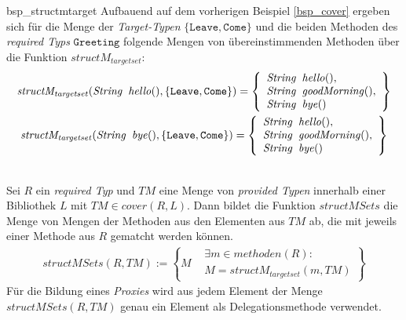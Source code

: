 \begin{example}{bsp_structmtarget}
Aufbauend auf dem vorherigen Beispiel \ref{bsp_cover} ergeben sich für die Menge der \emph{Target-Typen}  $\{\texttt{Leave}, \texttt{Come}\}$ und die beiden Methoden des \emph{required Typs} $\texttt{Greeting}$ folgende Mengen von übereinstimmenden Methoden über die Funktion $\mathit{structM_{targetset}}$:
\begin{gather*}
\mathit{structM_{targetset}(\mathit{String}\texttt{ }\mathit{hello()},\{\texttt{Leave}, \texttt{Come}\})} = 
\left\{
\begin{array}{l}
\mathit{String}\texttt{ }\mathit{hello()},\\
\mathit{String}\texttt{ }\mathit{goodMorning()},\\
\mathit{String}\texttt{ }\mathit{bye()}
\end{array}
\right\}\\
\mathit{structM_{targetset}(\mathit{String}\texttt{ }\mathit{bye()},\{\texttt{Leave}, \texttt{Come}\})} = 
\left\{
\begin{array}{l}
\mathit{String}\texttt{ }\mathit{hello()},\\
\mathit{String}\texttt{ }\mathit{goodMorning()},\\
\mathit{String}\texttt{ }\mathit{bye()}
\end{array}
\right\}
\end{gather*}
\end{example}
\noindent
\\
Sei $R$ ein \emph{required Typ} und $\mathit{TM}$ eine Menge von \emph{provided Typen} innerhalb einer Bibliothek $L$ mit $\mathit{TM} \in \mathit{cover(R,L)}$. Dann bildet die Funktion $\mathit{structMSets}$ die Menge von Mengen der Methoden aus den Elementen aus $\mathit{TM}$ ab, die mit jeweils einer Methode aus $R$ gematcht werden können.
\begin{gather*}
\mathit{structMSets(R,\mathit{TM})} := 
\left\{M
\begin{array}{l|l}
&\exists \mathit{m} \in \mathit{methoden(R)} : 
\\
&M = \mathit{structM_{targetset}(m,\mathit{TM})}
\end{array}
\right\}
\end{gather*}
\noindent
Für die Bildung eines \emph{Proxies} wird aus jedem Element der Menge $structMSets(R,\mathit{TM})$ genau ein Element als Delegationsmethode verwendet. 
